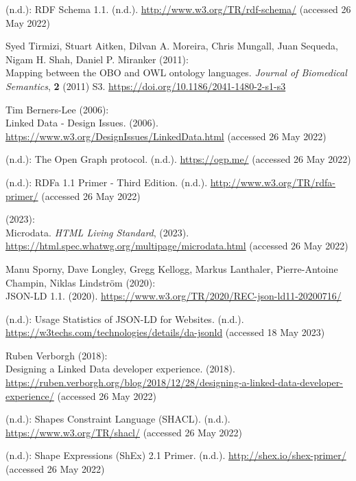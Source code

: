 \begin{thebibliography}{9}
(n.d.): {RDF Schema} 1.1. (n.d.). \url{http://www.w3.org/TR/rdf-schema/}
(accessed 26 May 2022)

Syed Tirmizi, Stuart Aitken, Dilvan A. Moreira, Chris Mungall, Juan
Sequeda, Nigam H. Shah, Daniel P. Miranker (2011): \\
Mapping between
the {OBO} and {OWL} ontology languages. \emph{Journal of Biomedical
Semantics}, \textbf{2} (2011) S3.
\url{https://doi.org/10.1186/2041-1480-2-s1-s3}

Tim Berners-Lee (2006): \\
Linked {Data} - {Design Issues}. (2006).
\url{https://www.w3.org/DesignIssues/LinkedData.html} (accessed 26 May
2022)

(n.d.): The {Open Graph} protocol. (n.d.). \url{https://ogp.me/}
(accessed 26 May 2022)

(n.d.): {RDFa} 1.1 {Primer} - {Third Edition}. (n.d.).
\url{http://www.w3.org/TR/rdfa-primer/} (accessed 26 May 2022)

(2023): \\
{Microdata}. \emph{{HTML Living Standard}}, (2023).
\url{https://html.spec.whatwg.org/multipage/microdata.html} (accessed 26
May 2022)

Manu Sporny, Dave Longley, Gregg Kellogg, Markus Lanthaler,
Pierre-Antoine Champin, Niklas Lindström (2020): \\
{JSON-LD} 1.1.
(2020). \url{https://www.w3.org/TR/2020/REC-json-ld11-20200716/}

(n.d.): {Usage Statistics of JSON-LD for Websites}. (n.d.).
\url{https://w3techs.com/technologies/details/da-jsonld} (accessed 18
May 2023)

Ruben Verborgh (2018): \\
Designing a {Linked Data} developer experience.
(2018).
\url{https://ruben.verborgh.org/blog/2018/12/28/designing-a-linked-data-developer-experience/}
(accessed 26 May 2022)

(n.d.): Shapes {Constraint Language} ({SHACL}). (n.d.).
\url{https://www.w3.org/TR/shacl/} (accessed 26 May 2022)

(n.d.): Shape {Expressions} ({ShEx}) 2.1 {Primer}. (n.d.).
\url{http://shex.io/shex-primer/} (accessed 26 May 2022)


\end{thebibliography}
